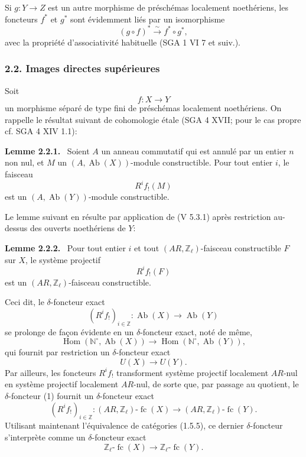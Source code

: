 \documentclass[11pt]{article}
\newenvironment{statement}[1]{\par\medskip\noindent\textbf{#1.}\ }{\par\medskip}
\DeclareMathOperator{\Hom}{Hom}
\providecommand{\Hom}{\operatorname{Hom}}
\providecommand{\Ab}{\operatorname{Ab}}
\providecommand{\fc}{\operatorname{fc}}
\begin{document}
Si \(g:Y\to Z\) est un autre morphisme de préschémas localement noethériens, les foncteurs \(f^*\) et \(g^*\) sont évidemment liés par un isomorphisme
\[
(g\circ f)^*\xrightarrow{\sim}f^*\circ g^*,
\]
avec la propriété d'associativité habituelle (SGA 1 VI 7 et suiv.).

\subsubsection*{2.2. Images directes supérieures}

Soit
\[
f:X\longrightarrow Y
\]
un morphisme séparé de type fini de préschémas localement noethériens. On rappelle le résultat suivant de cohomologie étale (SGA 4 XVII; pour le cas propre cf. SGA 4 XIV 1.1):

\begin{statement}{Lemme 2.2.1}
Soient \(A\) un anneau commutatif qui est annulé par un entier \(n\) non nul, et \(M\) un \((A,\Ab(X))\)-module constructible. Pour tout entier \(i\), le faisceau
\[
R^if_!(M)
\]
est un \((A,\Ab(Y))\)-module constructible.
\end{statement}

Le lemme suivant en résulte par application de (V 5.3.1) après restriction au-dessus des ouverts noethériens de \(Y\):

\begin{statement}{Lemme 2.2.2}
Pour tout entier \(i\) et tout \((AR,\mathbb Z_\ell)\)-faisceau constructible \(F\) sur \(X\), le système projectif
\[
R^if_!(F)
\]
est un \((AR,\mathbb Z_\ell)\)-faisceau constructible.
\end{statement}

Ceci dit, le \(\delta\)-foncteur exact
\[
(R^if_!)_{i\in\mathbb Z}:\Ab(X)\longrightarrow \Ab(Y)
\]
se prolonge de façon évidente en un \(\delta\)-foncteur exact, noté de même,
\[
\Hom(\mathbb N^\circ,\Ab(X))\longrightarrow \Hom(\mathbb N^\circ,\Ab(Y)),
\]
qui fournit par restriction un \(\delta\)-foncteur exact
\[
U(X)\longrightarrow U(Y).
\tag{1}
\]
Par ailleurs, les foncteurs \(R^if_!\) transforment système projectif localement \(AR\)-nul en système projectif localement \(AR\)-nul, de sorte que, par passage au quotient, le \(\delta\)-foncteur (1) fournit un \(\delta\)-foncteur exact
\[
(R^if_!)_{i\in\mathbb Z}:(AR,\mathbb Z_\ell)\text{-}\fc(X)
\longrightarrow (AR,\mathbb Z_\ell)\text{-}\fc(Y).
\]
Utilisant maintenant l'équivalence de catégories (1.5.5), ce dernier \(\delta\)-foncteur s'interprète comme un \(\delta\)-foncteur exact
\[
\mathbb Z_\ell\text{-}\fc(X)\longrightarrow \mathbb Z_\ell\text{-}\fc(Y).
\]
\end{document}
